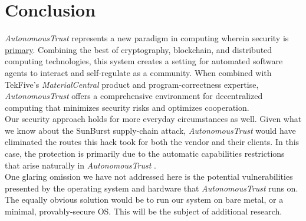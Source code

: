 \documentclass[10pt,twoside]{article}
\newcommand{\projectName}{\emph{AutonomousTrust }}
\newcommand{\analysisName}{\emph{MaterialCentral }}
\begin{document}
\section{Conclusion}\label{sec:conclusion}

\projectName represents a new paradigm in computing wherein security is \underline{primary}.
Combining the best of cryptography, blockchain, and distributed computing technologies, this system creates a setting for automated software agents to interact and self-regulate as a community.
When combined with TekFive's \analysisName product and program-correctness expertise, \projectName offers a comprehensive environment for decentralized computing that minimizes security risks and optimizes cooperation.
\\[10pt]


Our security approach holds for more everyday circumstances as well.
Given what we know about the SunBurst supply-chain attack, \projectName would have eliminated the routes this hack took for both the vendor and their clients.
In this case, the protection is primarily due to the automatic capabilities restrictions that arise naturally in \projectName.
\\[10pt]
One glaring omission we have not addressed here is the potential vulnerabilities presented by the operating system and hardware that \projectName runs on.
The equally obvious solution would be to run our system on bare metal, or a minimal, provably-secure OS. This will be the subject of additional research.

\nocite{*}


\end{document}
